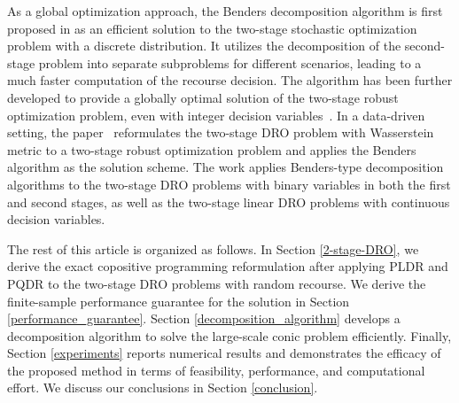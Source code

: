 \documentclass{article}
\begin{document}

 As a global optimization approach, the Benders decomposition algorithm is first proposed in \cite{benders-sp1, benders-sp2} as an efficient solution to the two-stage stochastic optimization problem with a discrete distribution. It utilizes the decomposition of the second-stage problem into separate subproblems for different scenarios, leading to a much faster computation of the recourse decision. The algorithm has been further developed to provide a globally optimal solution of the two-stage robust optimization problem, even with integer decision variables~\cite{benders-rp1, benders-rp2}. In a data-driven setting, the paper~\cite{benders-dro1} reformulates the two-stage DRO problem with Wasserstein metric to a two-stage robust optimization problem and applies the Benders algorithm as the solution scheme. The work \cite{benders-dro2} applies Benders-type  decomposition algorithms to the two-stage DRO problems with binary variables in both the first and second stages, as well as the two-stage linear DRO problems with continuous decision variables.


The rest of this article is organized as follows. In Section \ref{2-stage-DRO}, we derive the exact copositive programming reformulation after applying PLDR and PQDR to the two-stage DRO problems with random recourse. We derive the finite-sample performance guarantee for the solution %
in Section \ref{performance_guarantee}. Section \ref{decomposition_algorithm} develops a decomposition algorithm to solve the large-scale conic problem efficiently. %
Finally, Section \ref{experiments} reports numerical results and demonstrates the efficacy of the proposed method in terms of feasibility, performance, and computational effort. We discuss our conclusions in Section \ref{conclusion}. 
\end{document}
